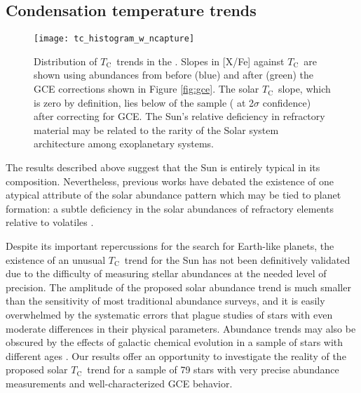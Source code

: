 \documentclass[twocolumn]{aastex62}
\newcommand{\tc}{$T_\mathrm{C}$}
\newcommand{\acronym}[1]{{\small{#1}}}
\begin{document}
\vspace{2mm}

\subsection{Condensation temperature trends}

\begin{figure}
\centering
\texttt{[image: tc\_histogram\_w\_ncapture]}
\caption{Distribution of \tc\ trends in the . Slopes in [X/Fe] against \tc\ are shown using abundances from before (blue) and after (green) the \acronym{GCE} corrections shown in Figure \ref{fig:gce}. The solar \tc\ slope, which is zero by definition, lies below  of the sample ( at 2$\sigma$ confidence) after correcting for \acronym{GCE}. The Sun's relative deficiency in refractory material may be related to the rarity of the Solar system architecture among exoplanetary systems.}
\label{fig:tchist}
\end{figure}

The results described above suggest that the Sun is entirely typical in its composition. Nevertheless, previous works have debated the existence of one atypical attribute of the solar abundance pattern which may be tied to planet formation: a subtle deficiency in the solar abundances of refractory elements relative to volatiles \citep{melendez09, ramirez09, adibekyan14, nissen15}. 

Despite its important repercussions for the search for Earth-like planets, the existence of an unusual \tc\ trend for the Sun has not been definitively validated due to the difficulty of measuring stellar abundances at the needed level of precision.
The amplitude of the proposed solar abundance trend is much smaller than the sensitivity of most traditional abundance surveys, and it is easily overwhelmed by the systematic errors that plague studies of stars with even moderate differences in their physical parameters.
Abundance trends may also be obscured by the effects of galactic chemical evolution in a sample of stars with different ages \citep{adibekyan14, nissen15, spina16}. 
Our results offer an opportunity to investigate the reality of the proposed solar \tc\ trend for a sample of 79 stars with very precise abundance measurements and well-characterized \acronym{GCE} behavior.
\end{document}
